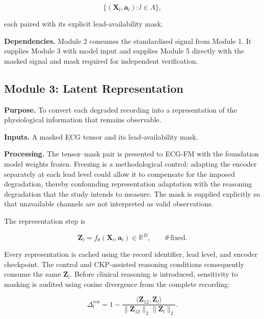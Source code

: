 \documentclass{ssnreview}
\begin{document}
\begin{equation}
  \{(\mathbf{X}_l,\mathbf{a}_l):l\in\Lambda\},
  \label{eq:masked-set}
\end{equation}

each paired with its explicit lead-availability mask.

\textbf{Dependencies.} Module 2 consumes the standardised signal from Module 1. It
supplies Module 3 with model input and supplies Module 5 directly with the masked signal
and mask required for independent verification.

\subsection{Module 3: Latent Representation}

\textbf{Purpose.} To convert each degraded recording into a representation of the
physiological information that remains observable.

\textbf{Inputs.} A masked ECG tensor and its lead-availability mask.

\textbf{Processing.} The tensor--mask pair is presented to ECG-FM with the foundation
model weights frozen. Freezing is a methodological control: adapting the encoder
separately at each lead level could allow it to compensate for the imposed degradation,
thereby confounding representation adaptation with the reasoning degradation that the
study intends to measure. The mask is supplied explicitly so that unavailable channels
are not interpreted as valid observations.

The representation step is

\begin{equation}
  \mathbf{Z}_l=f_{\theta}(\mathbf{X}_l,\mathbf{a}_l)
  \in\mathbb{R}^{D},\qquad \theta\ \text{fixed}.
  \label{eq:representation}
\end{equation}

Every representation is cached using the record identifier, lead level, and encoder
checkpoint. The control and CKP-assisted reasoning conditions consequently consume the
same $\mathbf{Z}_l$. Before clinical reasoning is introduced, sensitivity to masking is
audited using cosine divergence from the complete recording:

\begin{equation}
  \Delta^{\mathrm{cos}}_l
  =1-\frac{\langle\mathbf{Z}_{12},\mathbf{Z}_l\rangle}
  {\lVert\mathbf{Z}_{12}\rVert_2\lVert\mathbf{Z}_l\rVert_2}.
  \label{eq:cosine}
\end{equation}
\end{document}
